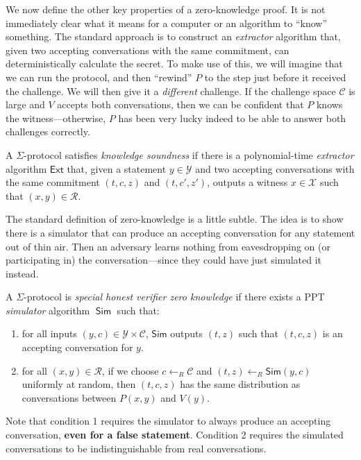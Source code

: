 \documentclass[12pt,a4paper]{article}
\DeclareMathOperator{\Sim}{\mathsf{Sim}}
\theoremstyle{definition}
\begin{document}
We now define the other key properties of a zero-knowledge proof. It is not immediately clear what it means for a computer or an algorithm to ``know'' something. The standard approach is to construct an \textit{extractor} algorithm that, given two accepting conversations with the same commitment, can deterministically calculate the secret. To make use of this, we will imagine that we can run the protocol, and then ``rewind'' $P$ to the step just before it received the challenge. We will then give it a \textit{different} challenge. If the challenge space $\mathcal{C}$ is large and $V$ accepts both conversations, then we can be confident that $P$ knows the witness---otherwise, $P$ has been very lucky indeed to be able to answer both challenges correctly.

\begin{definition}
    A $\Sigma$-protocol satisfies \textit{knowledge soundness} if there is a polynomial-time \textit{extractor} algorithm $\mathsf{Ext}$ that, given a statement $y\in\mathcal{Y}$ and two accepting conversations with the same commitment $(t, c, z)$ and $(t, c', z')$, outputs a witness $x\in\mathcal{X}$ such that $(x, y)\in\mathcal{R}$.
\end{definition}

The standard definition of zero-knowledge is a little subtle. The idea is to show there is a simulator that can produce an accepting conversation for any statement out of thin air. Then an adversary learns nothing from eavesdropping on (or participating in) the conversation---since they could have just simulated it instead.
\begin{definition}
    A $\Sigma$-protocol is \textit{special honest verifier zero knowledge} if there exists a PPT \textit{simulator} algorithm $\Sim$ such that:
    \begin{enumerate}
        \item for all inputs $(y, c)\in\mathcal{Y}\times\mathcal{C}$, $\mathsf{Sim}$ outputs $(t, z)$ such that $(t, c, z)$ is an accepting conversation for $y$.
        \item for all $(x, y)\in\mathcal{R}$, if we choose $c\gets_R\mathcal{C}$ and $(t, z)\gets_R\mathsf{Sim}(y, c)$ uniformly at random, then $(t, c, z)$ has the same distribution as conversations between $P(x, y)$ and $V(y)$.
    \end{enumerate}
\end{definition}

Note that condition 1 requires the simulator to always produce an accepting conversation, \textbf{even for a false statement}. Condition 2 requires the simulated conversations to be indistinguishable from real conversations.
\end{document}
